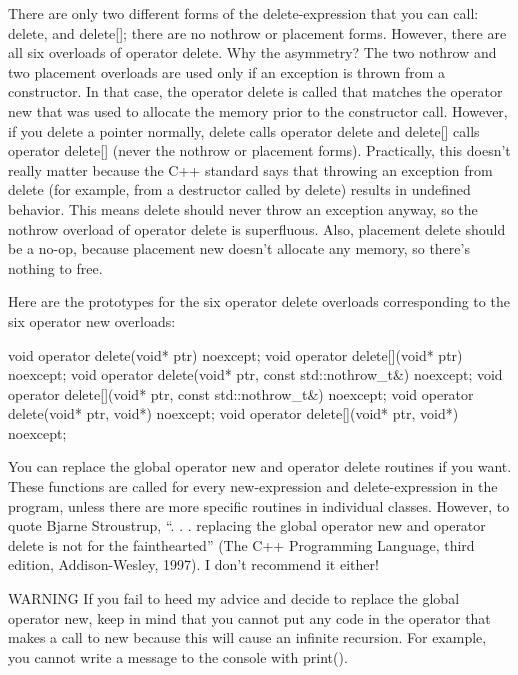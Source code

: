 There are only two different forms of the delete-expression that you can call: delete, and delete[]; there are no nothrow or placement forms. However, there are all six overloads of operator delete.
Why the asymmetry? The two nothrow and two placement overloads are used only if an exception is thrown from a constructor. In that case, the operator delete is called that matches the operator new that was used to allocate the memory prior to the constructor call. However, if you delete a pointer normally, delete calls operator delete and delete[] calls operator delete[] (never the nothrow or placement forms). Practically, this doesn’t really matter because the C++ standard says that throwing an exception from delete (for example, from a destructor called by delete) results in undefined behavior. This means delete should never throw an exception anyway, so the nothrow overload of operator delete is superfluous. Also, placement delete should be a no-op, because placement new doesn’t allocate any memory, so there’s nothing to free.

Here are the prototypes for the six operator delete overloads corresponding to the six operator new overloads:

\begin{cpp}
void operator delete(void* ptr) noexcept;
void operator delete[](void* ptr) noexcept;
void operator delete(void* ptr, const std::nothrow_t&) noexcept;
void operator delete[](void* ptr, const std::nothrow_t&) noexcept;
void operator delete(void* ptr, void*) noexcept;
void operator delete[](void* ptr, void*) noexcept;
\end{cpp}


You can replace the global operator new and operator delete routines if you want. These functions are called for every new-expression and delete-expression in the program, unless there are more specific routines in individual classes. However, to quote Bjarne Stroustrup, “. . . replacing the global operator new and operator delete is not for the fainthearted” (The C++ Programming Language, third edition, Addison-Wesley, 1997). I don’t recommend it either!

\begin{myWarning}{WARNING}
If you fail to heed my advice and decide to replace the global operator new, keep in mind that you cannot put any code in the operator that makes a call to new because this will cause an infinite recursion. For example, you cannot write a message to the console with print().
\end{myWarning}

